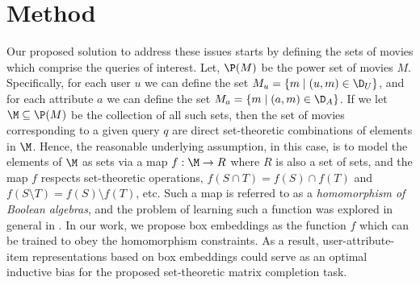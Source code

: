 \section{Method}
Our proposed solution to address these issues starts by defining the sets of movies which comprise the queries of interest. Let, $\P(M)$ be the power set of movies $M$. Specifically, for each user $u$ we can define the set $M_u = \{m \mid (u,m) \in \D_U\}$, and for each attribute $a$ we can define the set $M_a = \{m \mid (a,m) \in \D_A\}$. If we let $\M \subseteq \P(M)$  be the collection of all such sets, then the set of movies corresponding to a given query $q$ are direct set-theoretic combinations of elements in $\M$. Hence, the reasonable underlying assumption, in this case, is to model the elements of $\M$ as sets via a map $f: \M \to R$ where $R$ is also a set of sets, and the map $f$ respects set-theoretic operations, \ie $f(S \cap T) = f(S) \cap f(T)$ and $f(S \setminus T) = f(S) \setminus f(T)$, etc. Such a map is referred to as a \emph{homomorphism of Boolean algebras}, and the problem of learning such a function was explored in general in \citep{boratko2022measure}. In our work, we propose box embeddings as the function $f$ which can be trained to obey the homomorphism constraints.  As a result, user-attribute-item representations based on box embeddings could serve as an optimal inductive bias for the proposed set-theoretic matrix completion task.
